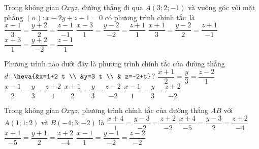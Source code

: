 \begin{ex}%
	Trong không gian $Oxyz$, đường thẳng đi qua  $A(3;2;-1)$ và vuông góc với mặt phẳng $(\alpha)\colon x-2y+z-1=0$ có phương trình chính tắc~là
	\choice 
		{$\dfrac{x-1}{3}=\dfrac{y+2}{2}=\dfrac{z-1}{-1}$} 
		{\True $\dfrac{x-3}{1}=\dfrac{y-2}{-2}=\dfrac{z+1}{1}$} 
		 {$\dfrac{x+1}{3}=\dfrac{y-2}{2}=\dfrac{z+1}{-1}$}
		 {$\dfrac{x+3}{1}=\dfrac{y+2}{-2}=\dfrac{z-1}{1}$}
\end{ex}

\begin{ex}%
	Phương trình  nào dưới đây là phương trình chính tắc của đường thẳng\break $d\colon \heva{&x=1+2 t \\ &y=3 t \\ & z=-2+t}$?
	 \choice
		{$\dfrac{x+1}{2}=\dfrac{y}{3}=\dfrac{z-2}{1}$} 
		 {\True $\dfrac{x-1}{2}=\dfrac{y}{3}=\dfrac{z+2}{1}$}
		 {$\dfrac{x+1}{2}=\dfrac{y}{3}=\dfrac{z-2}{-2}$}
		{$\dfrac{x-1}{1}=\dfrac{y}{3}=\dfrac{z+2}{-2}$} 
\end{ex}

\begin{ex}%
	 Trong không gian $Oxyz$, phương trình chính tắc của đường thẳng $AB$ với $A(1; 1; 2)$ và $B(-4; 3;-2)$ là
	 \choice
		 {$\dfrac{x+4}{1}=\dfrac{y-3}{-2}=\dfrac{z+2}{-2}$}
		{\True $\dfrac{x+4}{-5}=\dfrac{y-3}{2}=\dfrac{z+2}{-4}$} 
		 {$\dfrac{x+1}{-5}=\dfrac{y+1}{2}=\dfrac{z+2}{-4}$}
		{$\dfrac{x-1}{1}=\dfrac{y-1}{-2}=\dfrac{z-2}{-2}$} 
\end{ex}

